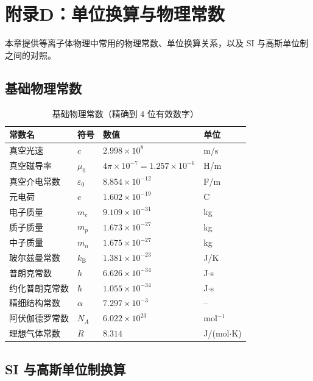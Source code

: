 \documentclass[12pt,a4paper,openany,oneside]{book}
\newcommand{\eps}{\varepsilon}
\begin{document}
\chapter*{附录D：单位换算与物理常数}

本章提供等离子体物理中常用的物理常数、单位换算关系，以及 SI 与高斯单位制之间的对照。


\section{基础物理常数}

\begin{table}[htbp]
\centering
\caption{基础物理常数（精确到 4 位有效数字）}
\label{tab:constants}
\begin{tabular}{@{}llll@{}}
\toprule
\textbf{常数名} & \textbf{符号} & \textbf{数值} & \textbf{单位} \\
\midrule
真空光速 & $c$ & $2.998\times 10^{8}$ & m/s \\
真空磁导率 & $\mu_0$ & $4\pi\times 10^{-7} = 1.257\times 10^{-6}$ & H/m \\
真空介电常数 & $\eps_0$ & $8.854\times 10^{-12}$ & F/m \\
元电荷 & $e$ & $1.602\times 10^{-19}$ & C \\
电子质量 & $m_e$ & $9.109\times 10^{-31}$ & kg \\
质子质量 & $m_p$ & $1.673\times 10^{-27}$ & kg \\
中子质量 & $m_n$ & $1.675\times 10^{-27}$ & kg \\
玻尔兹曼常数 & $k_\mathrm{B}$ & $1.381\times 10^{-23}$ & J/K \\
普朗克常数 & $h$ & $6.626\times 10^{-34}$ & J$\cdot$s \\
约化普朗克常数 & $\hbar$ & $1.055\times 10^{-34}$ & J$\cdot$s \\
精细结构常数 & $\alpha$ & $7.297\times 10^{-3}$ & -- \\
阿伏伽德罗常数 & $N_A$ & $6.022\times 10^{23}$ & mol$^{-1}$ \\
理想气体常数 & $R$ & $8.314$ & J/(mol$\cdot$K) \\
\bottomrule
\end{tabular}
\end{table}


\section{SI 与高斯单位制换算}
\end{document}
